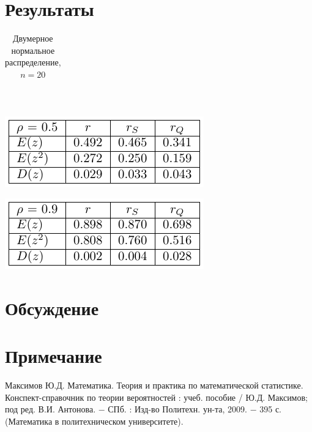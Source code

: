 \documentclass[a4paper]{article}
\begin{document}
\section{Результаты}
\begin{table}[H]
    \centering
    \begin{tabular}{|l|c|c|c|}
    \hline 
    
    \end{tabular}\\
    \begin{center}
        \includegraphics[]{LabSrcs/resources/20rho0.5.pdf}
    \end{center}
    \begin{center}
        \includegraphics{LabSrcs/resources/20rho0.9.pdf}
    \end{center}
    \caption{Двумерное нормальное распределение, $n=20$}
    \label{tab:my_label}
\end{table}
\section{Обсуждение}
\section*{Примечание}
\begin{thebibliography}{9}
 Максимов Ю.Д. Математика. Теория и практика по математической статистике. Конспект-справочник по теории вероятностей : учеб. пособие /
Ю.Д. Максимов; под ред. В.И. Антонова. $-$ СПб. : Изд-во Политехн.
ун-та, 2009. $-$ 395 с. (Математика в политехническом университете).
\end{thebibliography}
\end{document}
